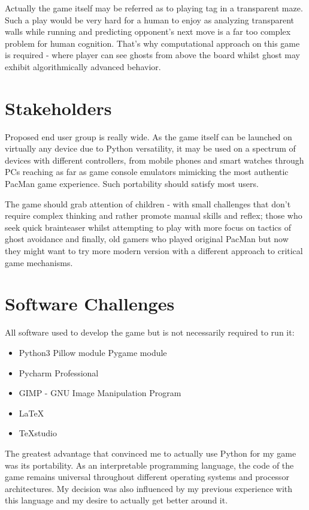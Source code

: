 \documentclass[11pt,a4paper]{report}
\begin{document}
			Actually the game itself may be referred as to playing tag in a transparent maze. Such a play would be very hard for a human to enjoy as analyzing transparent walls while running and predicting opponent's next move is a far too complex problem for human cognition. That's why computational approach on this game is required - where player can see ghosts from above the board whilst ghost may exhibit algorithmically advanced behavior.
		\section{Stakeholders}
			Proposed end user group is really wide. As the game itself can be launched on virtually any device due to Python versatility, it may be used on a spectrum of devices with different controllers, from mobile phones and smart watches through PCs reaching as far as game console emulators mimicking the most authentic PacMan game experience. Such portability should satisfy most users.
			
			The game should grab attention of children - with small challenges that don't require complex thinking and rather promote manual skills and reflex; those who seek quick brainteaser whilst attempting to play with more focus on tactics of ghost avoidance and finally, old gamers who played original PacMan but now they might want to try more modern version with a different approach to critical game mechanisms.
		\section{Software Challenges}
			All software used to develop the game but is not necessarily required to run it:
			\begin{itemize}
				\item Python3
				\subitem Pillow module
				\subitem Pygame module
				\item Pycharm Professional
				\item GIMP - GNU Image Manipulation Program
				\item \LaTeX
				\item TeXstudio
			\end{itemize}
			
			The greatest advantage that convinced me to actually use Python for my game was its portability. As an interpretable programming language, the code of the game remains universal throughout different operating systems and processor architectures. My decision was also influenced by my previous experience with this language and my desire to actually get better around it.
			
\end{document}
